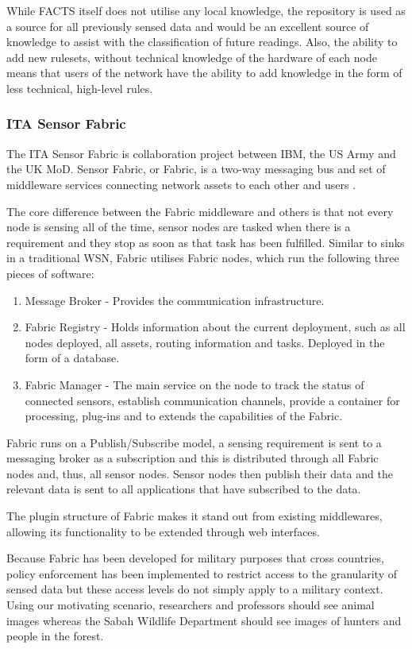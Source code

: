 		While FACTS itself does not utilise any local knowledge, the repository is used as a source for all previously sensed data and would be an excellent source of knowledge to assist with the classification of future readings. Also, the ability to add new rulesets, without technical knowledge of the hardware of each node means that users of the network have the ability to add knowledge in the form of less technical, high-level rules.

	\subsubsection{ITA Sensor Fabric}
	The ITA Sensor Fabric is collaboration project between IBM, the US Army and the UK MoD. Sensor Fabric, or Fabric, is a two-way messaging bus and set of middleware services connecting network assets to each other and users \cite{Wright2009b}.

The core difference between the Fabric middleware and others is that not every node is sensing all of the time, sensor nodes are tasked when there is a requirement and they stop as soon as that task has been fulfilled. Similar to sinks in a traditional WSN, Fabric utilises Fabric nodes, which run the following three pieces of software:
\begin{enumerate}
	\item Message Broker - Provides the communication infrastructure.
	\item Fabric Registry - Holds information about the current deployment, such as all nodes deployed, all assets, routing information and tasks. Deployed in the form of a database.
	\item Fabric Manager - The main service on the node to track the status of connected sensors, establish communication channels, provide a container for processing, plug-ins and to extends the capabilities of the Fabric.
\end{enumerate}

Fabric runs on a Publish/Subscribe model, a sensing requirement is sent to a messaging broker as a subscription and this is distributed through all Fabric nodes and, thus, all sensor nodes. Sensor nodes then publish their data and the relevant data is sent to all applications that have subscribed to the data. 

The plugin structure of Fabric makes it stand out from existing middlewares, allowing its functionality to be extended through web interfaces.

Because Fabric has been developed for military purposes that cross countries, policy enforcement has been implemented to restrict access to the granularity of sensed data but these access levels do not simply apply to a military context. Using our motivating scenario, researchers and professors should see animal images whereas the Sabah Wildlife Department should see images of hunters and people in the forest.


